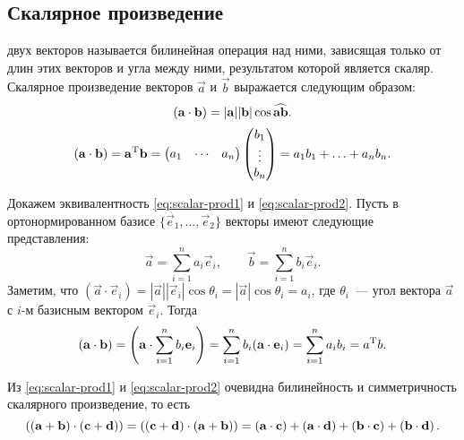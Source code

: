 \subsection{Скалярное произведение}
 двух векторов называется билинейная операция над ними, зависящая только от длин этих векторов и угла между ними, результатом которой является скаляр. Скалярное произведение векторов $\vec{a}$ и  $\vec{b}$ выражается следующим образом:
\begin{equation}
    \left(\mathbf{a} \cdot \mathbf{b}\right) = |\mathbf{a}||\mathbf{b}| \cos \widehat{\mathbf{a}\mathbf{b}}. \label{eq:scalar-prod1}
\end{equation}
\begin{equation}
    \left(\mathbf{a} \cdot \mathbf{b}\right) = \mathbf{a}^{\operatorname{T}} \mathbf{b} =
    \begin{pmatrix}
        a_1 & \cdots & a_n
    \end{pmatrix}
    \begin{pmatrix}
        b_1\\
        \vdots\\
        b_n
    \end{pmatrix}
    = a_1 b_1 + \ldots + a_n b_n.
    \label{eq:scalar-prod2}
\end{equation}

Докажем эквивалентность \eqref{eq:scalar-prod1} и \eqref{eq:scalar-prod2}. Пусть в ортонормированном базисе $\{\vec{e}_1, \ldots, \vec{e}_2\}$ векторы имеют следующие представления:
\begin{equation}
    \vec{a} = \sum\limits_{i = 1}^n a_i \vec{e}_i, \qquad \vec{b} = \sum\limits_{i = 1}^n b_i \vec{e}_i.
\end{equation}
Заметим, что $(\vec{a} \cdot \vec{e}_i) = |\vec{a}||\vec{e}_i| \cos \theta_i = |\vec{a}| \cos \theta_i = a_i$, где $\theta_i$~--- угол вектора $\vec{a}$ с $i$-м базисным вектором $\vec{e}_i$. Тогда
\begin{equation}
    \left(\mathbf{a} \cdot \mathbf{b}\right) = \left( \mathbf{a} \cdot \sum\limits_{i=1}^n b_i\mathbf{e}_i \right) = \sum\limits_{i=1}^n b_i(\mathbf{a} \cdot \mathbf{e}_i) = \sum\limits_{i=1}^n a_i b_i = a^{\operatorname{T}}b.
\end{equation}

Из \eqref{eq:scalar-prod1} и \eqref{eq:scalar-prod2} очевидна билинейность и симметричность скалярного произведение, то есть
\begin{equation}
    \left(\mathbf{(a + b)} \cdot \mathbf{(c + d)}\right) = \left(\mathbf{(c + d)} \cdot \mathbf{(a + b)}\right) = \left(\mathbf{a} \cdot \mathbf{c}\right) + \left(\mathbf{a} \cdot \mathbf{d}\right) + \left(\mathbf{b} \cdot \mathbf{c}\right) + \left(\mathbf{b} \cdot \mathbf{d}\right).
\end{equation}

